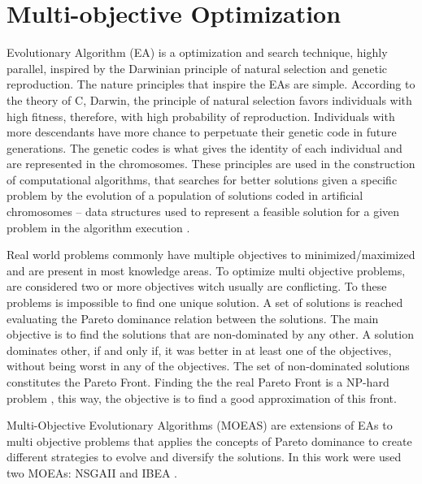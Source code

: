 



\section{Multi-objective Optimization} \label{sec:optimization}


Evolutionary Algorithm (EA) is a optimization and search technique, highly parallel, inspired by the Darwinian principle of natural selection and genetic reproduction. The nature principles that inspire the EAs are simple. According to the theory of C, Darwin, the principle of natural selection favors individuals with high fitness, therefore, with high probability of reproduction. Individuals with more descendants have more chance to perpetuate their genetic code in future generations. The genetic codes is what gives the identity of each individual and are represented in the chromosomes. These principles are used in the construction of computational algorithms, that searches for better solutions given a specific problem by the evolution of a population of solutions coded in artificial chromosomes -- data structures used to represent a feasible solution for a given problem in the algorithm execution \cite{pacheco1999algoritmos}.


Real world problems commonly have multiple objectives to minimized/maximized and are present in most knowledge areas. To optimize multi objective problems, are considered two or more objectives witch usually are conflicting. To these problems is impossible to find one unique solution. A set of solutions is reached evaluating the Pareto dominance relation \cite{pareto} between the solutions. The main objective is to find the solutions that are non-dominated by any other. A solution dominates other, if and only if, it was better in at least one of the objectives, without being worst in any of the objectives. The set of non-dominated solutions constitutes the Pareto Front. Finding the the real Pareto Front is a NP-hard problem \cite{fonseca2005tutorial}, this way, the objective is to find a good approximation of this front.


Multi-Objective Evolutionary Algorithms (MOEAS) are extensions of EAs to multi objective problems that applies the concepts of Pareto dominance to create different strategies to evolve and diversify the solutions. In this work were used two MOEAs: NSGAII \cite{deb2002fast} and IBEA \cite{zitzler2004indicator}.


